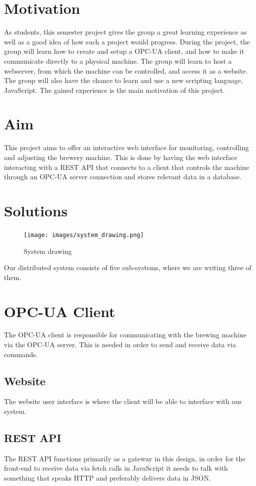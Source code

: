 \section{Motivation}
As students,
this semester project gives the group a great learning experience as well as a good idea of how such a project would progress.
During the project, the group will learn how to create and setup a OPC-UA client,
and how to make it communicate directly to a physical machine.
The group will learn to host a webserver, from which the machine can be controlled,
and access it as a website.
The group will also have the chance to learn and use a new scripting language, JavaScript.
The gained experience is the main motivation of this project.

\section{Aim}
This project aims to offer an interactive web interface for monitoring,
controlling and adjusting the brewery machine. This is done by having the web
interface interacting with a REST API that connects to a client that controls
the machine through an OPC-UA server connection and stores relevant data in a 
database.

\section{Solutions}
\begin{figure}[h]
\centering 
\texttt{[image: images/system\_drawing.png]}
\label{figure:system_drawing}
\caption{System drawing} 
\end{figure}

Our distributed system consists of five sub-systems, where we are writing three
of them.

\section{OPC-UA Client}
The OPC-UA client is responsible for communicating with the brewing machine via
the OPC-UA server. This is needed in order to send and receive data via
commands.

\subsection{Website}
The website user interface is where the client will be able to interface with
our system.

\subsection{REST API}
The REST API functions primarily as a gateway in this design, in order for the
front-end to receive data via fetch calls in JavaScript it needs to talk with
something that speaks HTTP and preferably delivers data in JSON.

